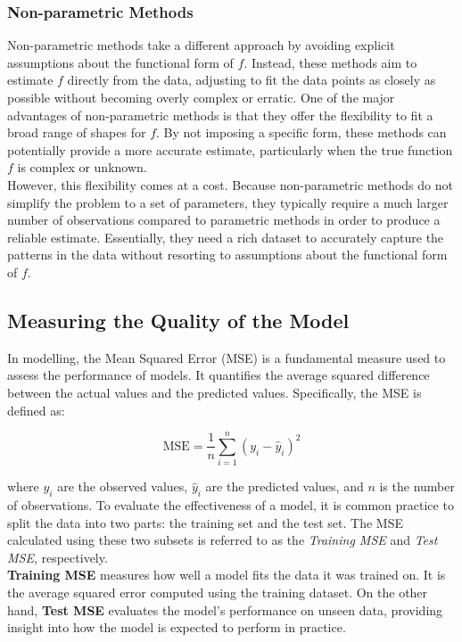 \subsubsection{Non-parametric Methods}

Non-parametric methods take a different approach by avoiding explicit assumptions about the functional form of $f$. Instead, these methods aim to estimate $f$ directly from the data, adjusting to fit the data points as closely as possible without becoming overly complex or erratic. One of the major advantages of non-parametric methods is that they offer the flexibility to fit a broad range of shapes for $f$. By not imposing a specific form, these methods can potentially provide a more accurate estimate, particularly when the true function $f$ is complex or unknown.\\

However, this flexibility comes at a cost. Because non-parametric methods do not simplify the problem to a set of parameters, they typically require a much larger number of observations compared to parametric methods in order to produce a reliable estimate. Essentially, they need a rich dataset to accurately capture the patterns in the data without resorting to assumptions about the functional form of $f$.

\subsection{Measuring the Quality of the Model}

In modelling, the Mean Squared Error (MSE) is a fundamental measure used to assess the performance of models. It quantifies the average squared difference between the actual values and the predicted values. Specifically, the MSE is defined as:

\[
\text{MSE} = \frac{1}{n} \sum_{i=1}^{n} (y_i - \hat{y}_i)^2
\]

where \( y_i \) are the observed values, \( \hat{y}_i \) are the predicted values, and \( n \) is the number of observations. To evaluate the effectiveness of a model, it is common practice to split the data into two parts: the training set and the test set. The MSE calculated using these two subsets is referred to as the \textit{Training MSE} and \textit{Test MSE}, respectively.\\

\textbf{Training MSE} measures how well a model fits the data it was trained on. It is the average squared error computed using the training dataset. On the other hand, \textbf{Test MSE} evaluates the model's performance on unseen data, providing insight into how the model is expected to perform in practice.\\

